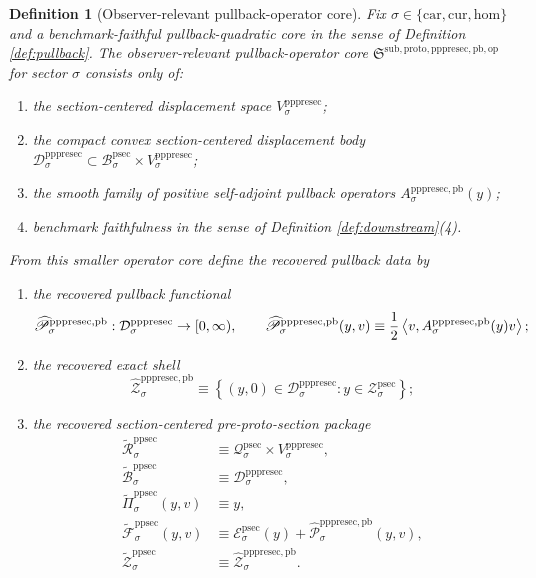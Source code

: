 \documentclass[11pt]{article}
\newcommand{\Car}{\mathrm{car}}
\newcommand{\Cur}{\mathrm{cur}}
\newcommand{\Hom}{\mathrm{hom}}
\newcommand{\ProtoSectionState}[1]{\mathcal Q_{#1}^{\mathrm{psec}}}
\newcommand{\ProtoSectionBody}[1]{\mathcal B_{#1}^{\mathrm{psec}}}
\newcommand{\ProtoSectionFunctional}[1]{\mathscr E_{#1}^{\mathrm{psec}}}
\newcommand{\ProtoSectionShell}[1]{\mathcal Z_{#1}^{\mathrm{psec}}}
\newcommand{\PrePreProtoSectionVertical}[1]{V_{#1}^{\mathrm{pppresec}}}
\newcommand{\PrePreProtoSectionResidualBody}[1]{\mathcal D_{#1}^{\mathrm{pppresec}}}
\newcommand{\PrePreProtoSectionPullbackOperator}[1]{A_{#1}^{\mathrm{pppresec,pb}}}
\newcommand{\PullbackOperatorCore}{\mathfrak S^{\mathrm{sub,proto,pppresec,pb,op}}}
\newcommand{\RecoveredPullbackFunctional}[1]{\widehat{\mathscr P}_{#1}^{\mathrm{pppresec,pb}}}
\newcommand{\RecoveredPullbackShell}[1]{\widehat{\mathcal Z}_{#1}^{\mathrm{pppresec,pb}}}
\newcommand{\OperatorCorePreProtoSectionState}[1]{\widetilde{\mathcal R}_{#1}^{\mathrm{ppsec}}}
\newcommand{\OperatorCorePreProtoSectionBody}[1]{\widetilde{\mathcal B}_{#1}^{\mathrm{ppsec}}}
\newcommand{\OperatorCorePreProtoSectionProj}[1]{\widetilde{\Pi}_{#1}^{\mathrm{ppsec}}}
\newcommand{\OperatorCorePreProtoSectionFunctional}[1]{\widetilde{\mathscr F}_{#1}^{\mathrm{ppsec}}}
\newcommand{\OperatorCorePreProtoSectionShell}[1]{\widetilde{\mathcal Z}_{#1}^{\mathrm{ppsec}}}
\newtheorem{definition}{Definition}
\begin{document}
\begin{definition}[Observer-relevant pullback-operator core]
\label{def:operatorcore}
Fix \(\sigma\in\{\Car,\Cur,\Hom\}\) and a benchmark-faithful pullback-quadratic core in the sense of Definition \ref{def:pullback}. The \emph{observer-relevant pullback-operator core} \(\PullbackOperatorCore\) for sector \(\sigma\) consists only of:
\begin{enumerate}
    \item the section-centered displacement space \(\PrePreProtoSectionVertical{\sigma}\);
    \item the compact convex section-centered displacement body \(\PrePreProtoSectionResidualBody{\sigma}\subset\ProtoSectionBody{\sigma}\times\PrePreProtoSectionVertical{\sigma}\);
    \item the smooth family of positive self-adjoint pullback operators \(\PrePreProtoSectionPullbackOperator{\sigma}(y)\);
    \item benchmark faithfulness in the sense of Definition \ref{def:downstream}(4).
\end{enumerate}
From this smaller operator core define the recovered pullback data by
\begin{enumerate}
    \item the recovered pullback functional
    \[
    \RecoveredPullbackFunctional{\sigma}:
    \PrePreProtoSectionResidualBody{\sigma}\to[0,\infty),
    \qquad
    \RecoveredPullbackFunctional{\sigma}(y,v)
    \equiv
    \frac{1}{2}
    \ev{v,\PrePreProtoSectionPullbackOperator{\sigma}(y)v};
    \]
    \item the recovered exact shell
    \[
    \RecoveredPullbackShell{\sigma}
    \equiv
    \left\{
    (y,0)\in\PrePreProtoSectionResidualBody{\sigma}:y\in\ProtoSectionShell{\sigma}
    \right\};
    \]
    \item the recovered section-centered pre-proto-section package
    \begin{align*}
    \OperatorCorePreProtoSectionState{\sigma}
    &\equiv
    \ProtoSectionState{\sigma}\times\PrePreProtoSectionVertical{\sigma},\\
    \OperatorCorePreProtoSectionBody{\sigma}
    &\equiv
    \PrePreProtoSectionResidualBody{\sigma},\\
    \OperatorCorePreProtoSectionProj{\sigma}(y,v)
    &\equiv
    y,\\
    \OperatorCorePreProtoSectionFunctional{\sigma}(y,v)
    &\equiv
    \ProtoSectionFunctional{\sigma}(y)+\RecoveredPullbackFunctional{\sigma}(y,v),\\
    \OperatorCorePreProtoSectionShell{\sigma}
    &\equiv
    \RecoveredPullbackShell{\sigma}.
    \end{align*}
\end{enumerate}
\end{definition}
\end{document}

